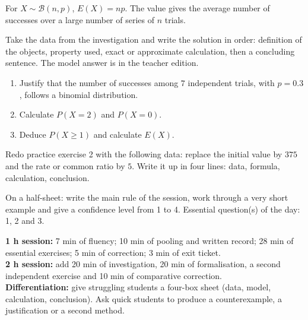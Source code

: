 \begin{traceecrite}For $X\sim\mathcal B(n,p)$, $E(X)=np$. The value gives the average number of successes over a large number of series of $n$ trials.\end{traceecrite}

\begin{exemple}
Take the data from the investigation and write the solution in order: definition of the objects, property used, exact or approximate calculation, then a concluding sentence. The model answer is in the teacher edition.
\end{exemple}

\begin{exercice}[-- essential]
\begin{enumerate}\item Justify that the number of successes among $7$ independent trials, with $p=0.3$, follows a binomial distribution.\item Calculate $P(X=2)$ and $P(X=0)$.\item Deduce $P(X\geq1)$ and calculate $E(X)$.\end{enumerate}
\end{exercice}


\begin{dm}Redo practice exercise 2 with the following data: replace the initial value by $375$ and the rate or common ratio by $5$. Write it up in four lines: data, formula, calculation, conclusion.\end{dm}

\begin{sortie}On a half-sheet: write the main rule of the session, work through a very short example and give a confidence level from 1 to 4. Essential question(s) of the day: 1, 2 and 3.\end{sortie}

\ifprof
\begin{methode}
\textbf{1 h session:} 7 min of fluency; 10 min of pooling and written record; 28 min of essential exercises; 5 min of correction; 3 min of exit ticket.\\
\textbf{2 h session:} add 20 min of investigation, 20 min of formalisation, a second independent exercise and 10 min of comparative correction.\\
\textbf{Differentiation:} give struggling students a four-box sheet (data, model, calculation, conclusion). Ask quick students to produce a counterexample, a justification or a second method.
\end{methode}
\fi
